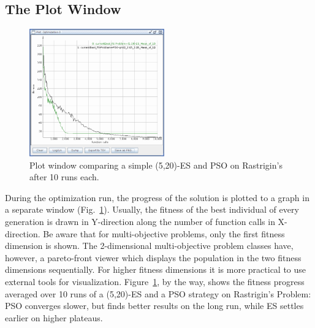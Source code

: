 \subsection{The Plot Window}

\begin{figure}
\noindent \begin{centering}
\includegraphics[width=0.52\textwidth]{pics/screenshot-plot-window}
\par\end{centering}

\caption{Plot window comparing a simple (5,20)-ES and PSO on Rastrigin's after
10 runs each.\label{fig:The-plot-window}}
\end{figure}


During the optimization run, the progress of the solution is plotted
to a graph in a separate window (Fig.~\ref{fig:The-plot-window}).
Usually, the fitness of the best individual of every generation is
drawn in Y-direction along the number of function calls in X-direction.
Be aware that for multi-objective problems, only the first fitness
dimension is shown. The 2-dimensional multi-objective problem classes
have, however, a pareto-front viewer which displays the population
in the two fitness dimensions sequentially. For higher fitness dimensions
it is more practical to use external tools for visualization. Figure~\ref{fig:The-plot-window},
by the way, shows the fitness progress averaged over 10 runs of a
(5,20)-ES and a PSO strategy on Rastrigin's Problem: PSO converges
slower, but finds better results on the long run, while ES settles
earlier on higher plateaus. 

